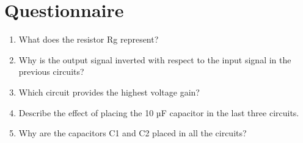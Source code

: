 \newpage
\section{Questionnaire}
\begin{enumerate}
    \item What does the resistor Rg represent?
    \item Why is the output signal inverted with respect to the input signal in the previous circuits?
    \item Which circuit provides the highest voltage gain?
    \item Describe the effect of placing the 10 µF capacitor in the last three circuits.
    \item Why are the capacitors C1 and C2 placed in all the circuits?
\end{enumerate}